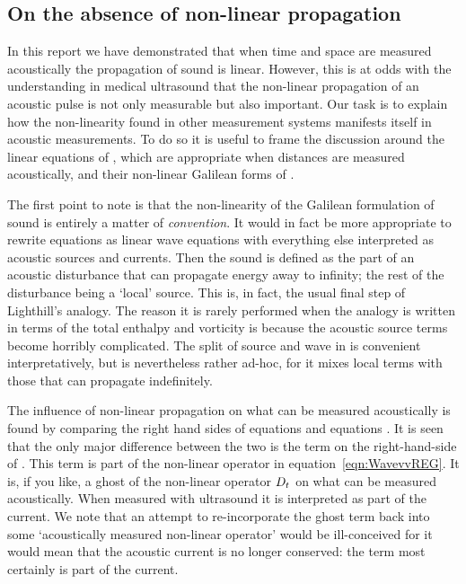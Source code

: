 \subsection{On the absence of non-linear propagation} \label{sec:NonlinearProp}

In this report we have demonstrated that when time and space are measured acoustically
the propagation of sound is linear.
However, this is at odds with the  understanding in medical ultrasound that the non-linear propagation of an acoustic pulse
is not only measurable but also important.
Our task is to explain how the non-linearity found in other measurement systems  manifests itself in acoustic measurements.
To do so it is useful to frame the discussion around the linear equations of
,
 which are appropriate when distances are measured acoustically,
and their non-linear Galilean forms of .

The first point to note is that the non-linearity of the Galilean formulation of sound is entirely a matter of {\em  convention}.
It would in fact be more appropriate to rewrite equations  as linear wave equations with everything else interpreted as acoustic sources and currents.
Then the sound is defined as the part of an acoustic disturbance that can propagate energy away to infinity;
the rest of the disturbance being a `local' source.
This is, in fact, the usual final step of Lighthill's analogy.
The reason it is rarely performed when the analogy is written in terms of the total enthalpy and vorticity is because
the acoustic source terms become horribly complicated.
The split of source and wave in  is convenient  interpretatively, but is nevertheless rather ad-hoc,
for it mixes local terms with those that can propagate indefinitely.

The influence of non-linear propagation on what can be measured acoustically is found by comparing the right hand sides of equations  and equations .
It is seen that the only major difference between the two is the term 
 on the right-hand-side of .
This term is part of the non-linear operator in equation~\ref{eqn:WavevvREG}.
It is, if you like, a ghost of the non-linear operator $D_t$ on what can be measured acoustically.
When measured with ultrasound it is interpreted  as part of the current.
We note that an attempt to re-incorporate the ghost  term back into some `acoustically measured non-linear operator' would be ill-conceived 
for it would mean that the acoustic current is no longer conserved:
the term %
most certainly is part of the current.




